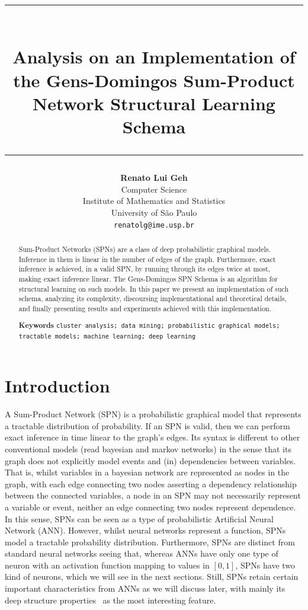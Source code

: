 \documentclass{amsart}
\title{%
  \noindent\rule{13cm}{1.0pt}\\
  \vspace{0.2cm}
  Analysis on an Implementation of the Gens-Domingos Sum-Product Network Structural Learning
  Schema
  \noindent\rule{13cm}{0.8pt}
}
\author[]{\normalsize\textbf{Renato Lui Geh}\\\small Computer Science\\Institute of Mathematics
  and Statistics\\University of São Paulo\\\texttt{renatolg@ime.usp.br}}
\theoremstyle{plain}
\numberwithin{equation}{section}
\begin{document}
\begin{abstract}
  Sum-Product Networks (SPNs) are a class of deep probabilistic graphical models. Inference in them
  is linear in the number of edges of the graph. Furthermore, exact inference is achieved, in a
  valid SPN, by running through its edges twice at most, making exact inference linear. The
  Gens-Domingos SPN Schema is an algorithm for structural learning on such models. In this paper we
  present an implementation of such schema, analyzing its complexity, discoursing implementational
  and theoretical details, and finally presenting results and experiments achieved with this
  implementation.

  \smallskip
  \smallskip
  \smallskip
  \textbf{Keywords}
  \smallskip
  \texttt{cluster analysis; data mining; probabilistic graphical models; tractable models; machine
  learning; deep learning}
  \vspace*{-3.5em}
\end{abstract}

\maketitle

\section{Introduction}

A Sum-Product Network (SPN) is a probabilistic graphical model that represents a tractable
distribution of probability. If an SPN is valid, then we can perform exact inference in time linear
to the graph's edges. Its syntax is different to other conventional models (read bayesian and
markov networks) in the sense that its graph does not explicitly model events and (in) dependencies
between variables. That is, whilst variables in a bayesian network are represented as nodes in the
graph, with each edge connecting two nodes asserting a dependency relationship between the
connected variables, a node in an SPN may not necessarily represent a variable or event, neither an
edge connecting two nodes represent dependence. In this sense, SPNs can be seen as a type of
probabilistic Artificial Neural Network (ANN). However, whilst neural networks represent a
function, SPNs model a tractable probability distribution. Furthermore, SPNs are distinct from
standard neural networks seeing that, whereas ANNs have only one type of neuron with an activation
function mapping to values in $[0,1]$, SPNs have two kind of neurons, which we will see in the next
sections. Still, SPNs retain certain important characteristics from ANNs as we will discuss later,
with mainly its deep structure properties~\cite{shallow-vs-deep} as the most interesting feature.
\end{document}
